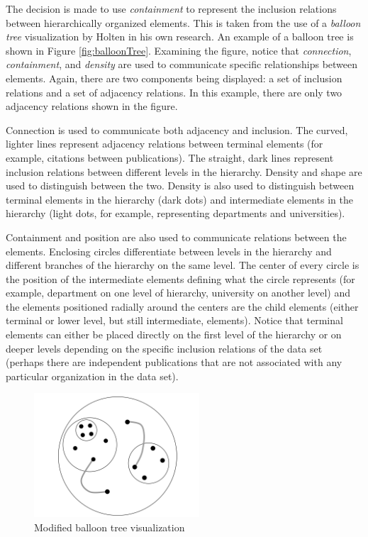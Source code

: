 The decision is made to use \emph{containment} to represent the inclusion relations between hierarchically organized elements. This is taken from the use of a \emph{balloon tree} visualization by Holten in his own research. An example of a balloon tree is shown in Figure \ref{fig:balloonTree}. Examining the figure, notice that \emph{connection}, \emph{containment}, and \emph{density} are used to communicate specific relationships between elements. Again, there are two components being displayed: a set of inclusion relations and a set of adjacency relations. In this example, there are only two adjacency relations shown in the figure. 

Connection is used to communicate both adjacency and inclusion. The curved, lighter lines represent adjacency relations between terminal elements (for example, citations between publications). The straight, dark lines represent inclusion relations between different levels in the hierarchy. Density and shape are used to distinguish between the two. Density is also used to distinguish between terminal elements in the hierarchy (dark dots) and intermediate elements in the hierarchy (light dots, for example, representing departments and universities). 

Containment and position are also used to communicate relations between the elements. Enclosing circles differentiate between levels in the hierarchy and different branches of the hierarchy on the same level. The center of every circle is the position of the intermediate elements defining what the circle represents (for example, department on one level of hierarchy, university on another level) and the elements positioned radially around the centers are the child elements (either terminal or lower level, but still intermediate, elements). Notice that terminal elements can either be placed directly on the first level of the hierarchy or on deeper levels depending on the specific inclusion relations of the data set (perhaps there are independent publications that are not associated with any particular organization in the data set).

\begin{figure}[htb]
\centering
\includegraphics[width=0.55\textwidth]{vijay_balloon.png}
\caption{Modified balloon tree visualization}
\label{fig:balloon}
\end{figure}

